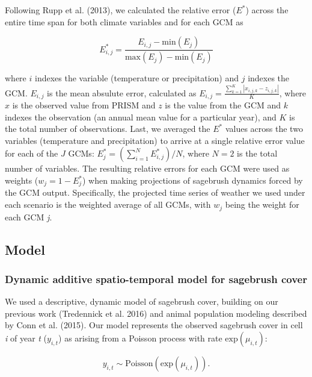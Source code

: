 \documentclass[
  12pt,
]{article}
\begin{document}
Following Rupp et al. (2013), we calculated the relative error (\(E^*\)) across the entire time span for both climate variables and for each GCM as

\begin{equation}
E_{i,j}^* = \frac{E_{i,j} - \text{min}(E_{j})}{\text{max}(E_{j}) - \text{min}(E_{j})}
\end{equation}

\noindent{}where \(i\) indexes the variable (temperature or precipitation) and \(j\) indexes the GCM.
\(E_{i,j}\) is the mean absulute error, calculated as \(E_{i,j} = \frac{\sum_{k=1}^K|x_{i,j,k} - z_{i,j,k}|}{K}\), where \(x\) is the observed value from PRISM and \(z\) is the value from the GCM and \(k\) indexes the observation (an annual mean value for a particular year), and \(K\) is the total number of observations.
Last, we averaged the \(E^*\) values across the two variables (temperature and precipitation) to arrive at a single relative error value for each of the \(J\) GCMs: \(E_{j}^* = \left(\sum_{i=1}^N E_{i,j}^* \right) / N\), where \(N = 2\) is the total number of variables.
The resulting relative errors for each GCM were used as weights (\(w_j = 1 - E_j^*\)) when making projections of sagebrush dynamics forced by the GCM output.
Specifically, the projected time series of weather we used under each scenario is the weighted average of all GCMs, with \(w_j\) being the weight for each GCM \emph{j}.

\hypertarget{model}{%
\subsection{Model}\label{model}}

\hypertarget{dynamic-additive-spatio-temporal-model-for-sagebrush-cover}{%
\subsubsection{Dynamic additive spatio-temporal model for sagebrush cover}\label{dynamic-additive-spatio-temporal-model-for-sagebrush-cover}}

We used a descriptive, dynamic model of sagebrush cover, building on our previous work (Tredennick et al. 2016) and animal population modeling described by Conn et al. (2015).
Our model represents the observed sagebrush cover in cell \emph{i} of year \emph{t} (\(y_{i,t}\)) as arising from a Poisson process with rate \(\text{exp}(\mu_{i,t})\):

\begin{equation}
y_{i,t} \sim \text{Poisson}(\text{exp}(\mu_{i,t})).
\end{equation}
\end{document}
